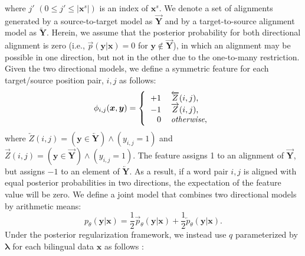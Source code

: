 \documentclass[english]{jnlp_1.4}
\begin{document}
where $j'$ $(0 \leq j' \leq |\boldsymbol{x}^s|)$ is an index of $\boldsymbol{x}^s$.
We denote a set of alignments generated by a source-to-target model as $\overrightarrow{\boldsymbol{Y}}$ and by a target-to-source alignment model as $\overleftarrow{\boldsymbol{Y}}$.
Herein, we assume that the posterior probability for both directional alignment is zero (i.e.,  $\overrightarrow{p}(\boldsymbol{y} | \boldsymbol{x}) = 0$ for $\boldsymbol{y} \not \in \overrightarrow{\boldsymbol{Y}}$), in which an alignment may be possible in one direction, but not in the other due to the one-to-many restriction.
Given the two directional models, we define a symmetric feature for each target/source position pair, $i,j$ as follows:
\begin{equation}
 \label{eqn:agrcons}
 \phi_{i,j}(\boldsymbol{x},\boldsymbol{y}) = 
 \left\{
 \begin{tabular}{rl}
  $+1$ & $\overleftarrow{Z}(i,j)$, \\
  $-1$ & $\overrightarrow{Z}(i,j)$, \\
  $0$  & \textit{otherwise},
  \end{tabular}
 \right.
\end{equation}
where $\overleftarrow{Z}(i,j)=(\boldsymbol{y} \in \overleftarrow{\boldsymbol{Y}}) \land (y_{i,j}=1)$ and $\overrightarrow{Z}(i,j)=(\boldsymbol{y} \in \overrightarrow{\boldsymbol{Y}}) \land (y_{i,j}=1)$.
The feature assigns 1 to an alignment of $\overrightarrow{\boldsymbol{Y}}$, but assigns $-1$ to an element of $\overleftarrow{\boldsymbol{Y}}$.
As a result,  if a word pair $i, j$ is aligned with equal posterior probabilities in two directions, 
\pagebreak
the expectation of the feature value will be zero.
We define a joint model that combines two directional models by arithmetic means:
\begin{equation}
p_\theta (\boldsymbol{y} | \boldsymbol{x}) = \frac{1}{2} \overrightarrow{p}_{\theta} (\boldsymbol{y} | \boldsymbol{x}) + \frac{1}{2} \overleftarrow{p}_{\theta} (\boldsymbol{y} | \boldsymbol{x}).
\end{equation}
Under the posterior regularization framework, we instead use $q$
parameterized by $\boldsymbol{\lambda}$ for each bilingual data $\boldsymbol{x}$  as follows \cite{ganchev2010posterior}:
\end{document}

